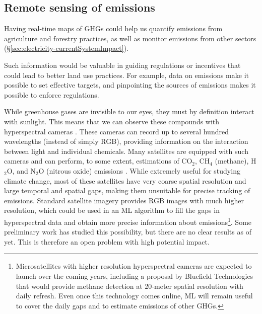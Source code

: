 \documentclass[11pt]{report}
\newcommand{\Gap}{\texorpdfstring{\hfill}{}}
\newcommand{\Rec}{\texorpdfstring{{\small\emph{\color{blue}{\fbox{High Leverage}}}}}{}}
\newcommand{\cd}{CO$_2$\xspace}
\begin{document}
\subsection{Remote sensing of emissions\Gap \Rec} \label{sec:emissions-detection}
Having real-time maps of GHGs could help us quantify emissions from agriculture and forestry practices, as well as monitor emissions from other sectors (\S \ref{sec:electricity-currentSystemImpact}).
 
Such information would be valuable in guiding regulations or incentives that could lead to better land use practices. For example, data on emissions make it possible to set effective targets, and pinpointing the sources of emissions makes it possible to enforce regulations.

While greenhouse gases are invisible to our eyes, they must by definition interact with sunlight. This means that we can observe these compounds with hyperspectral cameras \cite{Hyperspectral, scafutto2018detection}. These cameras can record up to several hundred wavelengths (instead of simply RGB), providing information on the interaction between light and individual chemicals. Many satellites are equipped with such cameras and can perform, to some extent, estimations of \cd, CH$_4$ (methane), H$_2$O, and N$_2$O (nitrous oxide) emissions \cite{jacob2016satellite, bernath2017near}. While extremely useful for studying climate change, most of these satellites have very coarse spatial resolution and large temporal and spatial gaps, making them unsuitable for precise tracking of emissions. Standard satellite imagery provides RGB images with much higher resolution, which could be used in an ML algorithm to fill the gaps in hyperspectral data and obtain more precise information about emissions\footnote{Microsatellites with higher resolution hyperspectral cameras are expected to launch over the coming years, including a proposal by Bluefield Technologies that would provide methane detection at 20-meter spatial resolution with daily refresh. Even once this technology comes online, ML will remain useful to cover the daily gaps and to estimate emissions of other GHGs.}. Some preliminary work \cite{jacob2016satellite} has studied this possibility, but there are no clear results as of yet. This is therefore an open problem with high potential impact.
\end{document}
